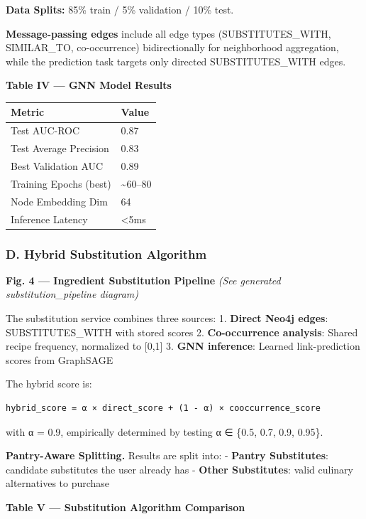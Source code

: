 \documentclass[
  10pt,
]{article}
\begin{document}
\textbf{Data Splits:} 85\% train / 5\% validation / 10\% test.

\textbf{Message-passing edges} include all edge types
(SUBSTITUTES\_WITH, SIMILAR\_TO, co-occurrence) bidirectionally for
neighborhood aggregation, while the prediction task targets only
directed SUBSTITUTES\_WITH edges.

\textbf{Table IV --- GNN Model Results}

\begin{longtable}[]{@{}ll@{}}
\toprule\noalign{}
Metric & Value \\
\midrule\noalign{}
\endhead
\bottomrule\noalign{}
\endlastfoot
Test AUC-ROC & 0.87 \\
Test Average Precision & 0.83 \\
Best Validation AUC & 0.89 \\
Training Epochs (best) & \textasciitilde60--80 \\
Node Embedding Dim & 64 \\
Inference Latency & \textless5ms \\
\end{longtable}

\subsubsection{D. Hybrid Substitution
Algorithm}\label{d.-hybrid-substitution-algorithm}

\textbf{Fig. 4 --- Ingredient Substitution Pipeline} \emph{(See
generated substitution\_pipeline diagram)}

The substitution service combines three sources: 1. \textbf{Direct Neo4j
edges}: SUBSTITUTES\_WITH with stored scores 2. \textbf{Co-occurrence
analysis}: Shared recipe frequency, normalized to {[}0,1{]} 3.
\textbf{GNN inference}: Learned link-prediction scores from GraphSAGE

The hybrid score is:

\begin{verbatim}
hybrid_score = α × direct_score + (1 - α) × cooccurrence_score
\end{verbatim}

with α = 0.9, empirically determined by testing α ∈ \{0.5, 0.7, 0.9,
0.95\}.

\textbf{Pantry-Aware Splitting.} Results are split into: -
\textbf{Pantry Substitutes}: candidate substitutes the user already has
- \textbf{Other Substitutes}: valid culinary alternatives to purchase

\textbf{Table V --- Substitution Algorithm Comparison}
\end{document}
